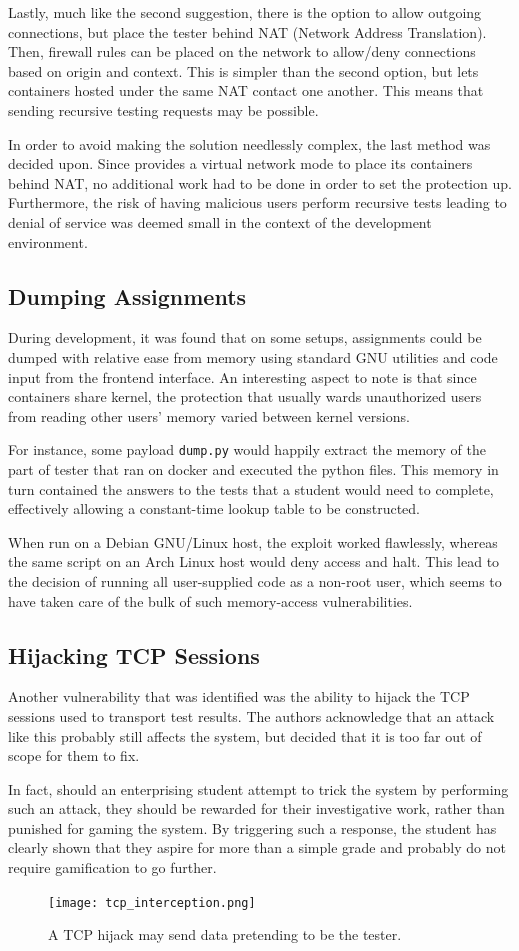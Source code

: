 Lastly, much like the second suggestion, there is the option to allow outgoing connections, but place the tester behind NAT (Network Address Translation). Then, firewall rules can be placed on the network to allow/deny connections based on origin and context. This is simpler than the second option, but lets containers hosted under the same NAT contact one another. This means that sending recursive testing requests may be possible.

In order to avoid making the solution needlessly complex, the last method was decided upon. Since \docker{} provides a virtual network mode to place its containers behind NAT, no additional work had to be done in order to set the protection up. Furthermore, the risk of having malicious users perform recursive tests leading to denial of service was deemed small in the context of the development environment.

\subsection{Dumping Assignments}\label{sec:dumping}
During development, it was found that on some setups, assignments could be dumped with relative ease from memory using standard GNU utilities and code input from the frontend interface. An interesting aspect to note is that since containers share kernel, the protection that usually wards unauthorized users from reading other users' memory varied between kernel versions.

For instance, some payload \texttt{dump.py} would happily extract the memory of the part of tester that ran on docker and executed the python files. This memory in turn contained the answers to the tests that a student would need to complete, effectively allowing a constant-time lookup table to be constructed.

When run on a Debian GNU/Linux host, the exploit worked flawlessly, whereas the same script on an Arch Linux host would deny access and halt. This lead to the decision of running all user-supplied code as a non-root user, which seems to have taken care of the bulk of such memory-access vulnerabilities.

\subsection{Hijacking TCP Sessions}
Another vulnerability that was identified was the ability to hijack the TCP sessions used to transport test results. The authors acknowledge that an attack like this probably still affects the system, but decided that it is too far out of scope for them to fix.

In fact, should an enterprising student attempt to trick the system by performing such an attack, they should be rewarded for their investigative work, rather than punished for gaming the system. By triggering such a response, the student has clearly shown that they aspire for more than a simple grade and probably do not require gamification to go further.
\begin{figure}
    \centering
    \texttt{[image: tcp\_interception.png]}
    \caption{A TCP hijack may send data pretending to be the tester.}
\end{figure}
